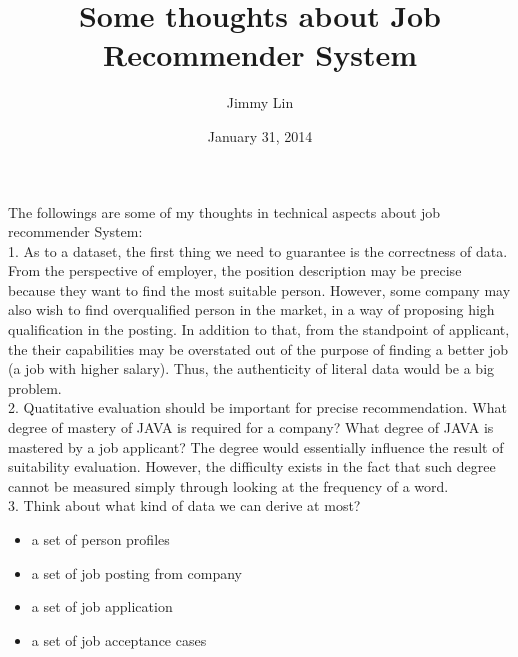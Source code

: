 \documentclass[11pt,a4paper]{article}
\title{Some thoughts about Job Recommender System}
\author{Jimmy Lin}
\date{January 31, 2014}
\begin{document}
\maketitle
The followings are some of my thoughts in technical aspects about job
recommender System: \\

1. As to a dataset, the first thing we need to guarantee is the 
correctness of data. From the perspective of employer, the position description may be
precise because they want to find the most suitable person. However, some
company may also wish to find overqualified person in the market, in a way of
proposing high qualification in the posting.  In addition to that, from the
standpoint of applicant, the their capabilities may be overstated out of the
purpose of finding a better job (a job with higher salary). Thus, the
authenticity of literal data would be a big problem.  \\

2. Quatitative evaluation should be important for precise recommendation. What
degree of mastery of JAVA is required for a company? What
degree of JAVA is mastered by a job applicant? The degree would essentially
influence the result of suitability evaluation. However, the difficulty exists
in the fact that such degree cannot be measured simply through looking at the
frequency of a word. \\

3. Think about what kind of data we can derive at most? 

\begin{itemize}
    \item{a set of person profiles}
    \item{a set of job posting from company}
    \item{a set of job application}
    \item{a set of job acceptance cases}
\end{itemize}
\end{document}
